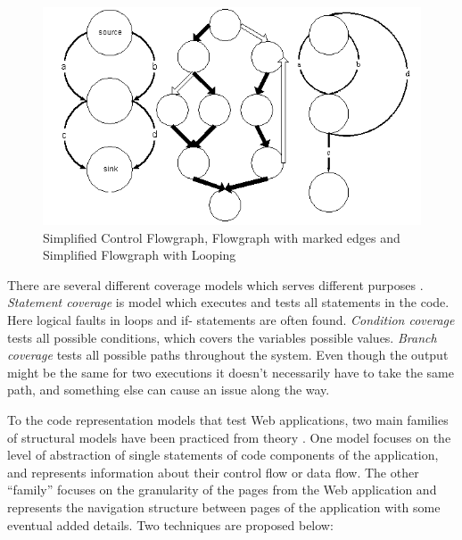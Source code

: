 \documentclass[a4paper, twocolumn]{ieee}
\begin{document}
\begin{figure}[H]
	\centering
	\includegraphics[scale=0.4]{fig.png}
	\caption{Simplified Control Flowgraph, Flowgraph with marked edges and Simplified Flowgraph with Looping}
\end{figure}



There are several different coverage models which serves different purposes \cite{ib03}. \emph{Statement coverage}
is model which executes and tests all statements in the code. Here logical faults in loops and if-
statements are often found. \emph{Condition coverage} tests all possible conditions, which covers the
variables possible values. \emph{Branch coverage} tests all possible paths throughout the system. Even
though the output might be the same for two executions it doesn’t necessarily have to take the same
path, and something else can cause an issue along the way.

To the code representation models that test Web applications, two main families of structural
models have been practiced from theory \cite{dlf06}. One model focuses on the level of abstraction of
single statements of code components of the application, and represents information about their
control flow or data flow. The other “family” focuses on the granularity of the pages from the Web
application and represents the navigation structure between pages of the application with some
eventual added details. Two techniques are proposed below:
\end{document}
